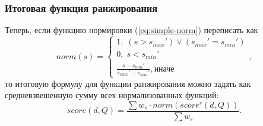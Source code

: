 \subsubsection{Итоговая функция ранжирования}
Теперь, если функцию нормировки (\ref{eq:simple-norm}) переписать как
\begin{equation}
  norm(s) = \begin{cases}
    1, \; (s > s_{max}')\lor (s_{max}' = s_{min}')\\
    0, \; s < s_{min}'\\
    \frac{s-s_{min}'}{s_{max}' - s_{min}'}, \text{иначе}
  \end{cases},
\end{equation}
то итоговую формулу для функции ранжирования можно задать как средневзвешенную сумму всех нормализованных функций:
\begin{equation}
  score(d, Q)=\frac{\sum w_s\cdot norm(score^s(d, Q))}{\sum w_s}.
\end{equation}
